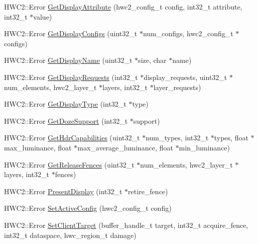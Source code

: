 \begin{DoxyCompactItemize}
H\+W\+C2\+::\+Error \mbox{\hyperlink{classandroid_1_1IAHWC2_1_1HwcDisplay_a221b06873ece677e034281d6d6ba4a7d}{Get\+Display\+Attribute}} (hwc2\+\_\+config\+\_\+t config, int32\+\_\+t attribute, int32\+\_\+t $\ast$value)
\item 
H\+W\+C2\+::\+Error \mbox{\hyperlink{classandroid_1_1IAHWC2_1_1HwcDisplay_a2585af6362380b84bb7a0371168a619a}{Get\+Display\+Configs}} (uint32\+\_\+t $\ast$num\+\_\+configs, hwc2\+\_\+config\+\_\+t $\ast$configs)
\item 
H\+W\+C2\+::\+Error \mbox{\hyperlink{classandroid_1_1IAHWC2_1_1HwcDisplay_a85c2cf183556e94c5c7cda586c92065f}{Get\+Display\+Name}} (uint32\+\_\+t $\ast$size, char $\ast$name)
\item 
H\+W\+C2\+::\+Error \mbox{\hyperlink{classandroid_1_1IAHWC2_1_1HwcDisplay_adb14a11cab4edf27c0dbe32ac345fadc}{Get\+Display\+Requests}} (int32\+\_\+t $\ast$display\+\_\+requests, uint32\+\_\+t $\ast$num\+\_\+elements, hwc2\+\_\+layer\+\_\+t $\ast$layers, int32\+\_\+t $\ast$layer\+\_\+requests)
\item 
H\+W\+C2\+::\+Error \mbox{\hyperlink{classandroid_1_1IAHWC2_1_1HwcDisplay_a21303b0cf590a97e2e20ea0270ba77df}{Get\+Display\+Type}} (int32\+\_\+t $\ast$type)
\item 
H\+W\+C2\+::\+Error \mbox{\hyperlink{classandroid_1_1IAHWC2_1_1HwcDisplay_a19ec46021d167d9cb0b0e57b7a9378d2}{Get\+Doze\+Support}} (int32\+\_\+t $\ast$support)
\item 
H\+W\+C2\+::\+Error \mbox{\hyperlink{classandroid_1_1IAHWC2_1_1HwcDisplay_ab94580c5495c24067ecd159c4bce2853}{Get\+Hdr\+Capabilities}} (uint32\+\_\+t $\ast$num\+\_\+types, int32\+\_\+t $\ast$types, float $\ast$max\+\_\+luminance, float $\ast$max\+\_\+average\+\_\+luminance, float $\ast$min\+\_\+luminance)
\item 
H\+W\+C2\+::\+Error \mbox{\hyperlink{classandroid_1_1IAHWC2_1_1HwcDisplay_a66f3567d548e8b875dd39697fe3f0015}{Get\+Release\+Fences}} (uint32\+\_\+t $\ast$num\+\_\+elements, hwc2\+\_\+layer\+\_\+t $\ast$layers, int32\+\_\+t $\ast$fences)
\item 
H\+W\+C2\+::\+Error \mbox{\hyperlink{classandroid_1_1IAHWC2_1_1HwcDisplay_a03669d74faa9a067891fb601a8ae6d40}{Present\+Display}} (int32\+\_\+t $\ast$retire\+\_\+fence)
\item 
H\+W\+C2\+::\+Error \mbox{\hyperlink{classandroid_1_1IAHWC2_1_1HwcDisplay_ab5538a77eb9b7d95fed27394d60a9c86}{Set\+Active\+Config}} (hwc2\+\_\+config\+\_\+t config)
\item 
H\+W\+C2\+::\+Error \mbox{\hyperlink{classandroid_1_1IAHWC2_1_1HwcDisplay_a7fbc348863a5e2d392895f51d338125b}{Set\+Client\+Target}} (buffer\+\_\+handle\+\_\+t target, int32\+\_\+t acquire\+\_\+fence, int32\+\_\+t dataspace, hwc\+\_\+region\+\_\+t damage)

\end{DoxyCompactItemize}
